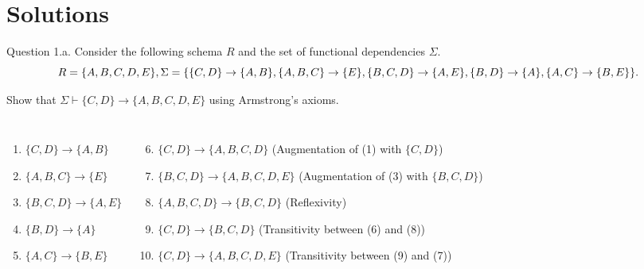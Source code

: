\documentclass{beamer}
\begin{document}
\section{Solutions}

\begin{frame}[fragile]{Question 1.a.}
\footnotesize
Consider the following schema $R$ and the set of functional dependencies $\Sigma$.
\[
R=\{A,B,C,D,E\},\\
\Sigma=\{\{C, D\} \to \{A,B\},\{A,B,C\} \to \{E\},\{B,C,D\} \to \{A,E\},\{B,D\} \to \{A\},\{A,C\} \to \{B,E\}\}.
\]

\pause
Show that $\Sigma \vdash \{C,D\} \to \{A,B,C,D,E\}$ using Armstrong's axioms.
\begin{columns}
        \begin{enumerate}
            \item $\{C,D\} \to \{A,B\}$
            \item $\{A,B,C\} \to \{E\}$
            \item $\{B,C,D\}\to \{A,E\}$
            \item $\{B,D\} \to \{A\}$
            \item $\{A,C\} \to \{B,E\}$
        \end{enumerate}
    \pause
    \begin{enumerate}
    \setcounter{enumi}{5}
        \item $\{C,D\} \to \{A,B,C,D\}$ (Augmentation of (1) with $\{C,D\}$)
        \pause
        \item $\{B,C,D\} \to \{A,B,C,D,E\}$ (Augmentation of (3) with $\{B,C,D\}$)
        \pause
        \item $\{A,B,C,D\}\to \{B,C,D\}$ (Reflexivity)
        \pause
        \item $\{C,D\}\to \{B,C,D\}$ (Transitivity between (6) and (8))
        \pause
        \item $\{C,D\}\to \{A,B,C,D,E\}$ (Transitivity between (9) and (7))
    \end{enumerate}
\end{columns}

\end{frame}
\end{document}
